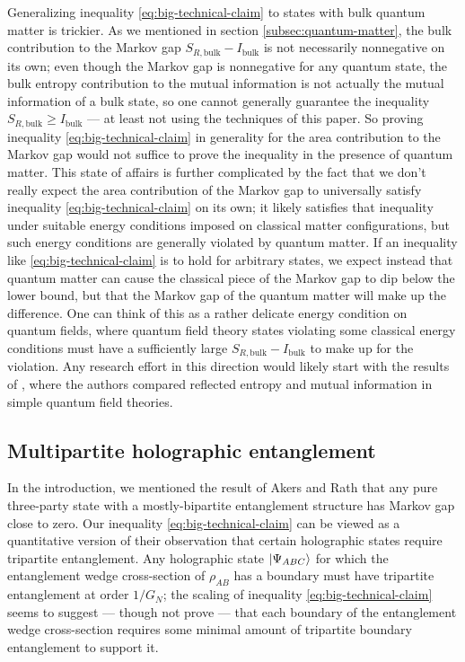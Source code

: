 \documentclass[a4paper,11pt]{article}
\begin{document}
Generalizing inequality \eqref{eq:big-technical-claim} to states with bulk quantum matter is trickier. As we mentioned in section \ref{subsec:quantum-matter}, the bulk contribution to the Markov gap $S_{R, \text{bulk}} - I_{\text{bulk}}$ is not necessarily nonnegative on its own; even though the Markov gap is nonnegative for any quantum state, the bulk entropy contribution to the mutual information is not actually the mutual information of a bulk state, so one cannot generally guarantee the inequality $S_{R, \text{bulk}} \geq I_{\text{bulk}}$ --- at least not using the techniques of this paper. So proving inequality \eqref{eq:big-technical-claim} in generality for the area contribution to the Markov gap would not suffice to prove the inequality in the presence of quantum matter. This state of affairs is further complicated by the fact that we don't really expect the area contribution of the Markov gap to universally satisfy inequality \eqref{eq:big-technical-claim} on its own; it likely satisfies that inequality under suitable energy conditions imposed on classical matter configurations, but such energy conditions are generally violated by quantum matter. If an inequality like \eqref{eq:big-technical-claim} is to hold for arbitrary states, we expect instead that quantum matter can cause the classical piece of the Markov gap to dip below the lower bound, but that the Markov gap of the quantum matter will make up the difference. One can think of this as a rather delicate energy condition on quantum fields, where quantum field theory states violating some classical energy conditions must have a sufficiently large $S_{R, \text{bulk}} - I_{\text{bulk}}$ to make up for the violation. Any research effort in this direction would likely start with the results of \cite{SRQFT1, SRQFT2, camargo2021long}, where the authors compared reflected entropy and mutual information in simple quantum field theories.

\subsection{Multipartite holographic entanglement}

In the introduction, we mentioned the result of Akers and Rath \cite{akers-rath-tripartite} that any pure three-party state with a mostly-bipartite entanglement structure has Markov gap close to zero. Our inequality \eqref{eq:big-technical-claim} can be viewed as a quantitative version of their observation that certain holographic states require tripartite entanglement. Any holographic state $\ket{\Psi_{ABC}}$ for which the entanglement wedge cross-section of $\rho_{AB}$ has a boundary must have tripartite entanglement at order $1/G_N$; the scaling of inequality \eqref{eq:big-technical-claim} seems to suggest --- though not prove --- that each boundary of the entanglement wedge cross-section requires some minimal amount of tripartite boundary entanglement to support it.
\end{document}
